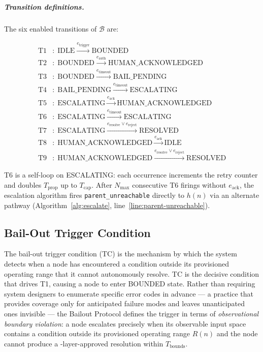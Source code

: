 \subparagraph{Transition definitions.} The six enabled transitions of $\mathcal{B}$ are:

\begin{align}
\text{T1} &:\; \text{IDLE} \xrightarrow{e_{\text{trigger}}} \text{BOUNDED} \tag{T1} \\
\text{T2} &:\; \text{BOUNDED} \xrightarrow{e_{\text{auth}}} \text{HUMAN\_ACKNOWLEDGED} \tag{T2} \\
\text{T3} &:\; \text{BOUNDED} \xrightarrow{e_{\text{timeout}}} \text{BAIL\_PENDING} \tag{T3} \\
\text{T4} &:\; \text{BAIL\_PENDING} \xrightarrow{e_{\text{timeout}}} \text{ESCALATING} \tag{T4} \\
\text{T5} &:\; \text{ESCALATING} \xrightarrow{e_{\text{ack}}} \text{HUMAN\_ACKNOWLEDGED} \tag{T5} \\
\text{T6} &:\; \text{ESCALATING} \xrightarrow{e_{\text{timeout}}} \text{ESCALATING} \tag{T6} \\
\text{T7} &:\; \text{ESCALATING} \xrightarrow{e_{\text{resolve}} \lor e_{\text{reject}}} \text{RESOLVED} \tag{T7} \\
\text{T8} &:\; \text{HUMAN\_ACKNOWLEDGED} \xrightarrow{e_{\text{ack}}} \text{IDLE} \tag{T8} \\
\text{T9} &:\; \text{HUMAN\_ACKNOWLEDGED} \xrightarrow{e_{\text{resolve}} \lor e_{\text{reject}}} \text{RESOLVED} \tag{T9}
\end{align}

T6 is a self-loop on ESCALATING: each occurrence increments the retry counter and doubles $T_{\text{prop}}$ up to $T_{\text{cap}}$. After $N_{\max}$ consecutive T6 firings without $e_{\text{ack}}$, the escalation algorithm fires \texttt{parent\_unreachable} directly to $h(n)$ via an alternate pathway (Algorithm~\ref{alg:escalate}, line~\ref{line:parent-unreachable}).

\subsection{Bail-Out Trigger Condition}\label{sec:bailout-trigger}

The bail-out trigger condition (TC) is the mechanism by which the \bxthree{} system detects when a node has encountered a condition outside its provisioned operating range that it cannot autonomously resolve. TC is the decisive condition that drives T1, causing a node to enter BOUNDED state. Rather than requiring system designers to enumerate specific error codes in advance — a practice that provides coverage only for anticipated failure modes and leaves unanticipated ones invisible — the Bailout Protocol defines the trigger in terms of \emph{observational boundary violation}: a node escalates precisely when its observable input space contains a condition outside its provisioned operating range $R(n)$ and the node cannot produce a \fact-layer-approved resolution within $T_{\text{bounds}}$.

